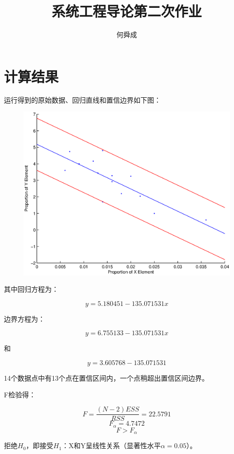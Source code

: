 \documentclass[UTF8]{ctexart}
\author{何舜成}
\title{系统工程导论第二次作业}
\begin{document}
\maketitle
\section{计算结果}
运行得到的原始数据、回归直线和置信边界如下图：\par
\begin{figure}[htbp]
  \centering
  \includegraphics[width=1.05\textwidth]{slot.eps}
\end{figure}
\par
其中回归方程为：\par
\begin{equation}
y = 5.180451 - 135.071531x
\end{equation}
\par
边界方程为：\par
\begin{equation}
y = 6.755133 - 135.071531x
\end{equation}
\par
和\par
\begin{equation}
y = 3.605768 - 135.071531
\end{equation}
\par
14个数据点中有13个点在置信区间内，一个点稍超出置信区间边界。\par
F检验得：\par
\begin{equation}
F=\frac{(N-2)ESS}{RSS}=22.5791
\end{equation}
\begin{equation}
F_{\alpha}=4.7472
\end{equation}
\begin{equation}
F>F_{\alpha}
\end{equation}
\par
拒绝$H_{0}$，即接受$H_{1}$：X和Y呈线性关系（显著性水平$\alpha=0.05$）。\par
\end{document}
